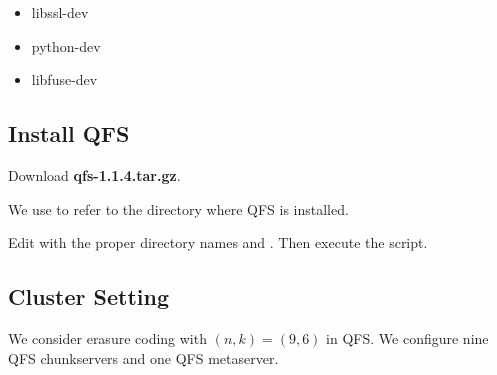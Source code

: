 \documentclass[letterpaper,12pt]{article}
\begin{document}
\begin{itemize}
\item libssl-dev

\begin{center}
\noindent{}
\end{center}

\item python-dev

\begin{center}
\noindent{}
\end{center}

\item libfuse-dev

\begin{center}
\noindent{}
\end{center}

\end{itemize}

\subsection{Install QFS}

Download {\bf qfs-1.1.4.tar.gz}.

\begin{center}
\noindent{}
\end{center}

We use  to refer to the directory where QFS is installed.

Edit  with the proper directory names
 and .  Then execute the script.

\begin{center}
\noindent{}
\end{center}

\subsection{Cluster Setting}

We consider erasure coding with $(n,k)=(9,6)$ in QFS.  We configure nine
QFS chunkservers and one QFS metaserver.
\end{document}
